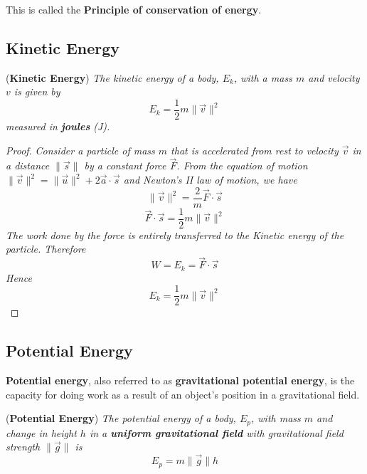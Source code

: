 \noindent This is called the \textbf{Principle of conservation of energy}.

\subsection{Kinetic Energy}

\begin{definition}{(\textbf{Kinetic Energy})}
\textit{The kinetic energy of a body, $E_k$, with a mass $m$ and velocity $v$ is given by}
\begin{equation}
    E_k = \frac{1}{2}m \| \vec{v} \|^2
\end{equation}
\textit{measured in \textbf{joules} (J).}
\begin{proof}
\textit{Consider a particle of mass $m$ that is accelerated from rest to velocity $\vec{v}$ in a distance $\| \vec{s} \|$ by a constant force $\vec{F}$. From the equation of motion $\| \vec{v} \|^2 = \| \vec{u} \|^2 + 2\vec{a} \cdot \vec{s}$ and Newton's II law of motion, we have}
\begin{equation*}
    \| \vec{v} \|^2 = \frac{2}{m} \vec{F} \cdot \vec{s}
\end{equation*}
\begin{equation*}
    \vec{F} \cdot \vec{s} = \frac{1}{2}m\| \vec{v} \|^2
\end{equation*}
\textit{The work done by the force is entirely transferred to the Kinetic energy of the particle. Therefore}
\begin{equation*}
    W = E_k = \vec{F} \cdot \vec{s}
\end{equation*}
\textit{Hence}
\begin{equation*}
    E_k = \frac{1}{2}m \| \vec{v} \|^2
\end{equation*}
\end{proof}
\end{definition}

\subsection{Potential Energy}

\textbf{Potential energy}, also referred to as \textbf{gravitational potential energy}, is the capacity for doing work as a result of an object's position in a gravitational field.

\begin{definition}{(\textbf{Potential Energy})}
\textit{The potential energy of a body, $E_p$, with mass $m$ and change in height $h$ in a \textbf{uniform gravitational field} with gravitational field strength $\| \vec{g} \|$ is}
\begin{equation}
    E_p = m\| \vec{g} \|h
\end{equation}
\end{definition}

